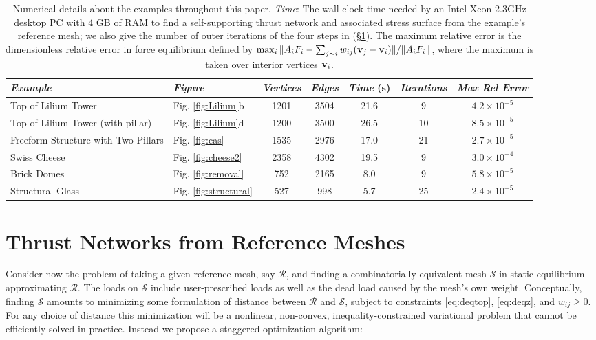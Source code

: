 \documentclass[review]{acmsiggraph}
\def\SS{{\mathcal S}}
\def\RR{{\mathcal R}}
\newcommand{\secref}[1]{(\S\ref{#1})}
\begin{document}
\begin{table}[t]
	\bigskip
\begin{tabular}{@{}llccccc@{}}
\hline
	\textit{Example} 
		& \textit{Figure} 
		& \textit{Vertices}  
		& \textit{Edges} 
			& \textit{Time} (s) 
			& \textit{Iterations} 
			& \textit{Max Rel Error} \\
	\hline
		Top of Lilium Tower 
		& Fig. \ref{fig:Lilium}b
		& 1201 
		& 3504 
			& 21.6 
			& 9 
			& $4.2 \times 10^{-5}$
	\\ Top of Lilium Tower (with pillar) 
		& Fig. \ref{fig:Lilium}d
		& 1200 
		& 3500 
			& 26.5 
			& 10 
			& $8.5 \times 10^{-5}$
	\\ Freeform Structure with Two Pillars 
		& Fig. \ref{fig:cas} 
		& 1535 
		& 2976 
			& 17.0 
			& 21 
			& $2.7\times 10^{-5}$
	\\ Swiss Cheese 
		& Fig. \ref{fig:cheese2} 
		& 2358 
		& 4302 
			& 19.5 
			& 9 
			& $3.0 \times 10^{-4}$
	\\ Brick Domes 
		& Fig. \ref{fig:removal} 
		& 752 
		& 2165 
			& 8.0 
			& 9 
			& $5.8 \times 10^{-5}$
	\\ Structural Glass 
		& Fig. \ref{fig:structural} 
		& 527 
		& 998 
			& 5.7 
			& 25 
			& $2.4\times 10^{-5}$
	\\ \hline
  \end{tabular}
	\medskip
	\caption{Numerical details about the examples throughout this 
paper. \emph{Time}: The wall-clock time needed by an Intel Xeon 2.3GHz 
desktop PC with 4 GB of RAM to find a self-supporting thrust network and 
associated stress surface from the example's reference mesh; we also give 
the number of outer iterations of the four steps in \secref{sec:opt}. The 
maximum relative error is the dimensionless relative error in force 
equilibrium defined by $\max_i \| A_i F_i - \sum\nolimits_{j\sim i} w_{ij} 
({\mathbf v}_j-{\mathbf v}_i) \|/\|A_i F_i\|$, where the maximum is taken over interior vertices ${\mathbf v}_i$. 
} \label{table:data}


\end{table}


\section{Thrust Networks from Reference Meshes} \label{sec:opt} 

Consider now the problem of taking a given reference mesh, say $\RR$, and 
finding a combinatorially equivalent mesh $\SS$ in static equilibrium 
approximating $\RR$. The loads on $\SS$ include user-prescribed loads as 
well as the dead load caused by the mesh's own weight. Conceptually, 
finding $\SS$ amounts to minimizing some formulation of distance between 
$\RR$ and $\SS$, subject to constraints \eqref{eq:deqtop}, 
\eqref{eq:deqz}, and $w_{ij} \geq 0$. For any choice of distance this 
minimization will be a nonlinear, non-convex, inequality-constrained 
variational problem that cannot be efficiently solved in practice. Instead 
we propose a staggered optimization algorithm:
\end{document}
